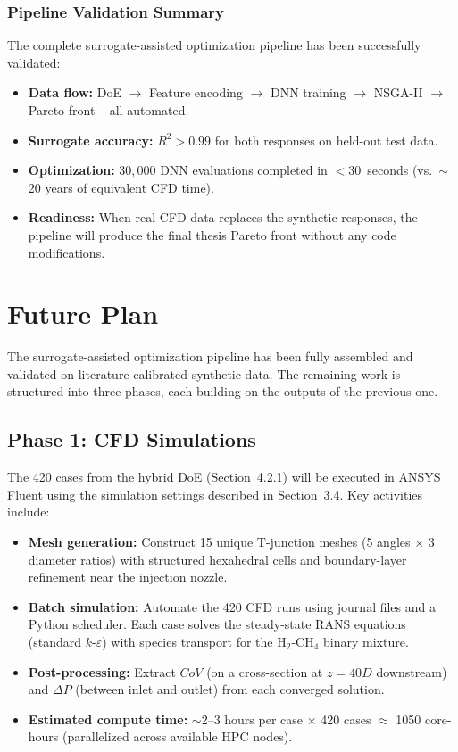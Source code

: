 \documentclass[12pt, a4paper]{report}
\begin{document}
\subsection{Pipeline Validation Summary}

The complete surrogate-assisted optimization pipeline has been successfully validated:
\begin{itemize}
    \item \textbf{Data flow:} DoE $\to$ Feature encoding $\to$ DNN training $\to$ NSGA-II $\to$ Pareto front -- all automated.
    \item \textbf{Surrogate accuracy:} $R^2 > 0.99$ for both responses on held-out test data.
    \item \textbf{Optimization:} $30{,}000$ DNN evaluations completed in $<$30~seconds (vs.\  $\sim$20 years of equivalent CFD time).
    \item \textbf{Readiness:} When real CFD data replaces the synthetic responses, the pipeline will produce the final thesis Pareto front without any code modifications.
\end{itemize}

\chapter{Future Plan}

The surrogate-assisted optimization pipeline has been fully assembled and validated on literature-calibrated synthetic data. The remaining work is structured into three phases, each building on the outputs of the previous one.

\section{Phase 1: CFD Simulations}

The 420 cases from the hybrid DoE (Section~4.2.1) will be executed in ANSYS Fluent using the simulation settings described in Section~3.4. Key activities include:
\begin{itemize}
    \item \textbf{Mesh generation:} Construct 15 unique T-junction meshes (5 angles $\times$ 3 diameter ratios) with structured hexahedral cells and boundary-layer refinement near the injection nozzle.
    \item \textbf{Batch simulation:} Automate the 420 CFD runs using journal files and a Python scheduler. Each case solves the steady-state RANS equations (standard $k$-$\varepsilon$) with species transport for the H$_2$-CH$_4$ binary mixture.
    \item \textbf{Post-processing:} Extract $CoV$ (on a cross-section at $z = 40D$ downstream) and $\Delta P$ (between inlet and outlet) from each converged solution.
    \item \textbf{Estimated compute time:} $\sim$2--3 hours per case $\times$ 420 cases $\approx$ 1050 core-hours (parallelized across available HPC nodes).
\end{itemize}
\end{document}
